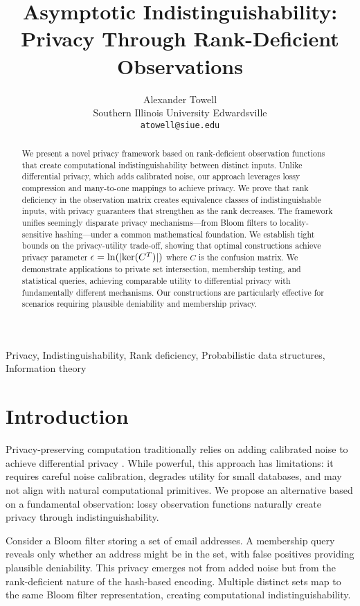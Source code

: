\documentclass[11pt]{article}
\title{Asymptotic Indistinguishability:\\Privacy Through Rank-Deficient Observations}
\author{Alexander Towell\\
Southern Illinois University Edwardsville\\
\texttt{atowell@siue.edu}}
\begin{document}
\maketitle

\begin{abstract}
We present a novel privacy framework based on rank-deficient observation functions that create computational indistinguishability between distinct inputs. Unlike differential privacy, which adds calibrated noise, our approach leverages lossy compression and many-to-one mappings to achieve privacy. We prove that rank deficiency in the observation matrix creates equivalence classes of indistinguishable inputs, with privacy guarantees that strengthen as the rank decreases. The framework unifies seemingly disparate privacy mechanisms—from Bloom filters to locality-sensitive hashing—under a common mathematical foundation. We establish tight bounds on the privacy-utility trade-off, showing that optimal constructions achieve privacy parameter $\epsilon = \ln(|\text{ker}(C^T)|)$ where $C$ is the confusion matrix. We demonstrate applications to private set intersection, membership testing, and statistical queries, achieving comparable utility to differential privacy with fundamentally different mechanisms. Our constructions are particularly effective for scenarios requiring plausible deniability and membership privacy.
\end{abstract}

\begin{IEEEkeywords}
Privacy, Indistinguishability, Rank deficiency, Probabilistic data structures, Information theory
\end{IEEEkeywords}

\section{Introduction}

Privacy-preserving computation traditionally relies on adding calibrated noise to achieve differential privacy \cite{dwork2006}. While powerful, this approach has limitations: it requires careful noise calibration, degrades utility for small databases, and may not align with natural computational primitives. We propose an alternative based on a fundamental observation: lossy observation functions naturally create privacy through indistinguishability.

Consider a Bloom filter storing a set of email addresses. A membership query reveals only whether an address might be in the set, with false positives providing plausible deniability. This privacy emerges not from added noise but from the rank-deficient nature of the hash-based encoding. Multiple distinct sets map to the same Bloom filter representation, creating computational indistinguishability.
\end{document}
